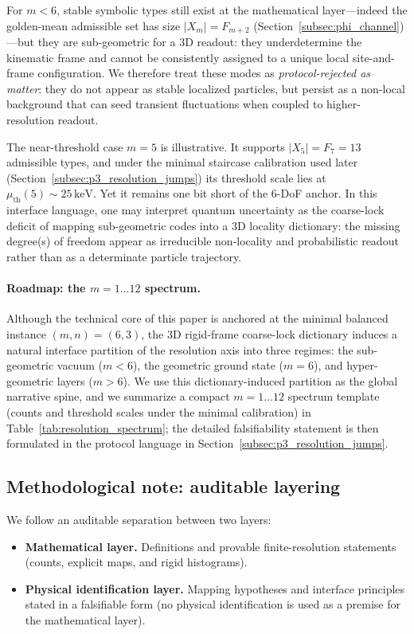 For $m<6$, stable symbolic types still exist at the mathematical layer---indeed the golden-mean admissible set has size $|X_m|=F_{m+2}$ (Section~\ref{subsec:phi_channel})---but they are sub-geometric for a $3$D readout: they underdetermine the kinematic frame and cannot be consistently assigned to a unique local site-and-frame configuration.
We therefore treat these modes as \emph{protocol-rejected as matter}: they do not appear as stable localized particles, but persist as a non-local background that can seed transient fluctuations when coupled to higher-resolution readout.

The near-threshold case $m=5$ is illustrative.
It supports $|X_5|=F_7=13$ admissible types, and under the minimal staircase calibration used later (Section~\ref{subsec:p3_resolution_jumps}) its threshold scale lies at $\mu_{\mathrm{th}}(5)\sim 25\,\mathrm{keV}$.
Yet it remains one bit short of the 6-DoF anchor.
In this interface language, one may interpret quantum uncertainty as the coarse-lock deficit of mapping sub-geometric codes into a $3$D locality dictionary: the missing degree(s) of freedom appear as irreducible non-locality and probabilistic readout rather than as a determinate particle trajectory.

\paragraph{Roadmap: the $m=1\ldots 12$ spectrum.}
Although the technical core of this paper is anchored at the minimal balanced instance $(m,n)=(6,3)$, the $3$D rigid-frame coarse-lock dictionary induces a natural interface partition of the resolution axis into three regimes:
the sub-geometric vacuum ($m<6$), the geometric ground state ($m=6$), and hyper-geometric layers ($m>6$).
We use this dictionary-induced partition as the global narrative spine, and we summarize a compact $m=1\ldots 12$ spectrum template (counts and threshold scales under the minimal calibration) in Table~\ref{tab:resolution_spectrum}; the detailed falsifiability statement is then formulated in the protocol language in Section~\ref{subsec:p3_resolution_jumps}.

\subsection{Methodological note: auditable layering}
\label{subsec:audit_layering}

We follow an auditable separation between two layers:
\begin{itemize}
\item \textbf{Mathematical layer.}
Definitions and provable finite-resolution statements (counts, explicit maps, and rigid histograms).
\item \textbf{Physical identification layer.}
Mapping hypotheses and interface principles stated in a falsifiable form (no physical identification is used as a premise for the mathematical layer).
\end{itemize}
